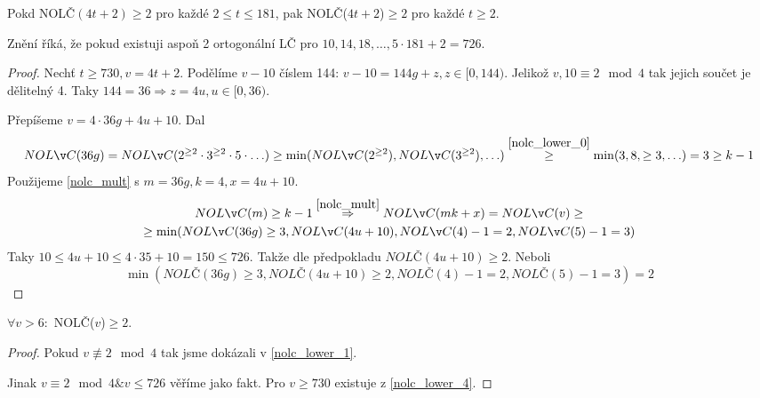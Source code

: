 \begin{lemma}\label{nolc_lower_4}
    Pokd NOLČ$(4t+2) \geq 2$ pro každé $2\leq t\leq 181$, pak NOLČ($4t+2$)$\geq 2$ pro každé $t\geq 2$.

    Znění říká, že pokud existuji aspoň 2 ortogonální LČ pro $10, 14, 18, \ldots, 5 \cdot 181 +2 = 726$.
\end{lemma}
\begin{proof}
	Nechť $t \geq 730, v = 4t + 2$.
	Podělíme $v - 10$ číslem 144: $v - 10 = 144 g + z, z \in [0, 144)$.
	Jelikož $v, 10 \equiv 2 \mod4$ tak jejich součet je dělitelný 4.
	Taky $144 = 36 \Rightarrow z = 4u, u \in [0, 36)$.

	Přepíšeme $v = 4 \cdot 36g + 4u + 10$.
	Dal
	\[ NOLČ(36g) = NOLČ(2^{\geq 2} \cdot 3^{\geq 2} \cdot 5 \cdot \ldots) \geq \min(NOLČ(2^{\geq 2}), NOLČ(3^{\geq 2}), \ldots) \stackrel{\cref{nolc_lower_0}}{\geq} \min(3, 8, \geq 3, \ldots) = 3 \geq k - 1 \]
	Použijeme \cref{nolc_mult} s $m = 36g, k = 4, x = 4u + 10$.
	\begin{gather*}
		NOLČ(m) \geq k - 1 \stackrel{\cref{nolc_mult}}{\Rightarrow} NOLČ(mk + x) = NOLČ(v) \geq \\
		\geq \min(NOLČ(36g) \geq 3, NOLČ(4u + 10), NOLČ(4) - 1 = 2, NOLČ(5) - 1 = 3) \\
	\end{gather*}
	Taky $10 \leq 4u + 10 \leq 4\cdot35 + 10 = 150 \leq 726$.
	Takže dle předpokladu $NOLČ(4u + 10) \geq 2$.
	Neboli
	\[ \min(NOLČ(36g) \geq 3, NOLČ(4u + 10) \geq 2, NOLČ(4) - 1 = 2, NOLČ(5) - 1 = 3) = 2 \]
\end{proof}

\begin{theorem}
    $\forall v>6:$ NOLČ($v$)$\geq 2$.
\end{theorem}
\begin{proof}
	Pokud $v \not\equiv 2 \mod4$ tak jsme dokázali v \cref{nolc_lower_1}.

	Jinak $v \equiv 2 \mod4 \& v \leq 726$ věříme jako fakt.
	Pro $v \geq 730$ existuje z \cref{nolc_lower_4}.
\end{proof}
